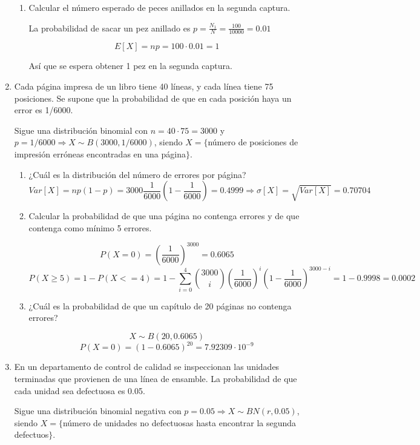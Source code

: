 \documentclass[11pt]{article}
\newcommand{\tick}{\textbf{\color{green}{ (\checkmark) }}}
\begin{document}
\begin{enumerate}
\begin{enumerate}
\item Calcular el número esperado de peces anillados en la segunda captura.

La probabilidad de sacar un pez anillado es $p=\frac{N_1}{N}=\frac{100}{10000}=0.01$

\[
E[X]=np=100\cdot 0.01=1
\]

Así que se espera obtener 1 pez en la segunda captura.

\end{enumerate}

\item \tick Cada página impresa de un libro tiene 40 líneas, y cada línea tiene 75 posiciones. Se supone que la probabilidad de que en cada posición haya un error es 1/6000.

Sigue una distribución binomial con $n=40\cdot 75=3000$ y $p=1/6000 \Longrightarrow X \sim B(3000, 1/6000)$, siendo $X=\{$número de posiciones de impresión erróneas encontradas en una página$\}$.


\begin{enumerate}
\item ¿Cuál es la distribución del número de errores por página?
\[
Var[X] = np(1-p) = 3000\frac{1}{6000}(1-\frac{1}{6000})=0.4999 \Longrightarrow \sigma [X] = \sqrt{Var[X]} = 0.70704
\]

\item Calcular la probabilidad de que una página no contenga errores y de que contenga como mínimo 5 errores.

\[
P(X=0)= (\frac{1}{6000})^{3000} = 0.6065
\]
\[
P(X \geq 5)=1 - P(X<=4) = 1 - \sum_{i=0}^4\binom{3000}{i}(\frac{1}{6000})^i(1-\frac{1}{6000})^{3000-i}=1-0.9998 = 0.0002
\]

\item ¿Cuál es la probabilidad de que un capítulo de 20 páginas no contenga errores?

\[
X \sim B(20, 0.6065)
\]
\[
P(X=0) = (1-0.6065)^{20} = 7.92309 \cdot  10^{-9}
\]

\end{enumerate}

\item \tick En un departamento de control de calidad se inspeccionan las unidades terminadas que provienen de una línea de ensamble. La probabilidad de que cada unidad sea defectuosa es 0.05.

Sigue una distribución binomial negativa con $p=0.05 \Longrightarrow X \sim BN(r, 0.05)$, siendo $X=\{$número de unidades no defectuosas hasta encontrar la segunda defectuos$\}$.


\end{enumerate}
\end{document}
